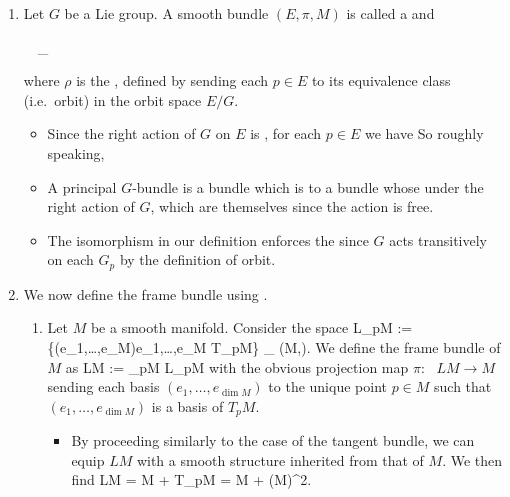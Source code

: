 \documentclass{article}
\newcommand{\GL}{\operatorname{GL}}
\newcommand{\cl}{:\text{ }}
\begin{document}
\begin{enumerate}
\begin{itemize}
\end{itemize}

\item {}
Let $G$ be a Lie group. A smooth bundle $(E,\pi,M)$ is called a   and
\bse
{}
\ \ \cong_{}
\ese
where $\rho$ is the , defined by sending each $p\in E$ to its equivalence class (i.e.\ orbit) in the orbit space $E/G$.

\begin{itemize}
    \item Since the right action of $G$ on $E$ is , for each $p\in E$ we have
So roughly speaking, 
\item A principal $G$-bundle is a bundle which is  to a bundle whose  under the right action of $G$, which are themselves  since the action is free.
\item The isomorphism in our definition enforces the  since $G$ acts transitively on each $G_p$ by the definition of orbit.
\end{itemize}


\item {} We now define the frame bundle using .
\begin{enumerate}

\item Let $M$ be a smooth manifold. Consider the space
\bse
L_pM := \{(e_1,\ldots,e_{\dim M})\mid e_1,\ldots,e_{\dim M} T_pM\} \cong_{} \GL(\dim M,\R).
\ese
We define the frame bundle of $M$ as
\bse
LM := \coprod_{p\in M} L_pM
\ese
with the obvious projection map $\pi\cl LM \to M$ sending each basis $(e_1,\ldots,e_{\dim M})$ to the unique point $p\in M$ such that $(e_1,\ldots,e_{\dim M})$ is a basis of $T_pM$.
{\tiny \begin{itemize}
    \item By proceeding similarly to the case of the tangent bundle, we can equip $LM$ with a smooth structure inherited from that of $M$. We then find
\bse
\dim LM = \dim M + \dim T_pM = \dim M + (\dim M)^2.
\ese
\end{itemize}}



\end{enumerate}
\end{enumerate}
\end{document}
